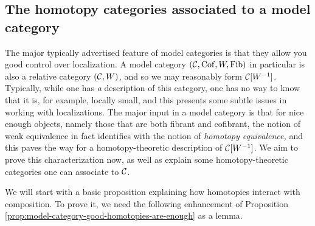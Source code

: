 \subsection{The homotopy categories associated to a model category}

The major typically advertised feature of model categories is that they allow you good control over localization. A model category \((\mathcal{C},\operatorname{Cof},W,\operatorname{Fib})\) in particular is also
a relative category \((\mathcal{C},W)\), and so we may reasonably form \(\mathcal{C}[W^{-1}]\). Typically, while one has \emph{a} description of this category, one has no way to know
that it is, for example, locally small, and this presents some subtle issues in working with localizations. The major input in a model category is that for nice enough objects,
namely those that are both fibrant and cofibrant, the notion of weak equivalence in fact identifies with the notion of \emph{homotopy equivalence,} and this paves the way for
a homotopy-theoretic description of \(\mathcal{C}[W^{-1}]\). We aim to prove this characterization now, as well as explain some homotopy-theoretic categories one can associate to \(\mathcal{C}\).

We will start with a basic proposition explaining how homotopies interact with composition. To prove it, we need the following enhancement of Proposition \ref{prop:model-category-good-homotopies-are-enough}
as a lemma.

